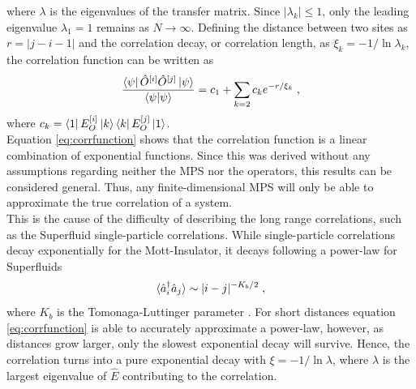 where $\lambda$ is the eigenvalues of the transfer matrix. Since $|\lambda_k| \leq 1 $, only the leading eigenvalue $\lambda_1 = 1$ remains as $N \to \infty$. Defining the distance between two sites as $r = |j - i -1|$ and the correlation decay, or correlation length, as $\xi_k = -1/\ln \lambda_k$, the correlation function can be written as
\begin{equation}
	\frac{\bra{\psi} \hat{O}^{[i]} \hat{O}^{[j]} \ket{\psi}}{\braket{\psi | \psi}} = c_1 + \sum_{k = 2} c_k e^{-r/ \xi_k} \; , \label{eq:corrfunction}
\end{equation}
where $c_k = \bra{1} E_{O}^{[i]} \ket{k} \bra{k} E_{O}^{[j]} \ket{1}$. \cite{schollwock} \\
Equation \eqref{eq:corrfunction} shows that the correlation function is a linear combination of exponential functions. Since this was derived without any assumptions regarding neither the MPS nor the operators, this results can be considered general. Thus, any finite-dimensional MPS will only be able to approximate the true correlation of a system.\\
This is the cause of the difficulty of describing the long range correlations, such as the Superfluid single-particle correlations. While single-particle correlations decay exponentially for the Mott-Insulator, it decays following a power-law for Superfluids
\begin{equation}
	\braket{\hat{a}_{i}^{\dag} \hat{a}_{j}} \sim |i - j|^{-K_b /2} \; ,
\end{equation}
where $K_b$ is the Tomonaga-Luttinger parameter \cite{characPhases}. For short distances equation \eqref{eq:corrfunction} is able to accurately approximate a power-law, however, as distances grow larger, only the slowest exponential decay will survive. Hence, the correlation turns into a pure exponential decay with $\xi = -1/ \ln \lambda$, where $\lambda$ is the largest eigenvalue of $\hat{E}$ contributing to the correlation.


